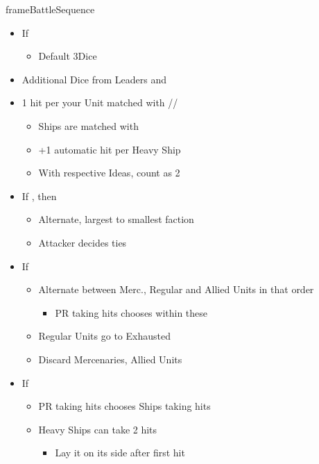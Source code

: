 \documentclass[10pt]{article}
\newlength{\fhBattleSequence} \setlength\fhBattleSequence{50\baselineskip}
\begin{document}
\begin{dynamiccontents*}{frameBattleSequence}
\begin{eubox}{\fhBattleSequence}
\begin{multicols}{2}
\begin{itemize}
\begin{itemize}
			\end{itemize}
			\item If 
			\begin{itemize}
				\item Default 3\artillery Dice
			\end{itemize}
			\item Additional Dice from Leaders and \battleactions
			\item 1 hit per your Unit matched with \infantry/\cavalry/\artillery
			\begin{itemize}
				\item Ships are matched with \artillery
				\item +1 automatic hit per Heavy Ship
				\item With respective Ideas, count \tercios as 2\infantry
			\end{itemize}
		\end{itemize}
		\begin{itemize}
			\item If , then
			\begin{itemize}
				\item Alternate, largest to smallest faction
				\item Attacker decides ties
			\end{itemize}
			\item If 
			\begin{itemize}
				\item Alternate between Merc., Regular and Allied Units in that order
				\begin{itemize}
					\item PR taking hits chooses within these
				\end{itemize}
				\item Regular Units go to Exhausted \manpower
				\item Discard Mercenaries, Allied Units
			\end{itemize}
			\item If 
			\begin{itemize}
				\item PR taking hits chooses Ships taking hits
				\item Heavy Ships can take 2 hits
				\begin{itemize}
					\item Lay it on its side after first hit
				\end{itemize}

\end{itemize}
\end{itemize}
\end{multicols}
\end{eubox}
\end{dynamiccontents*}
\end{document}
